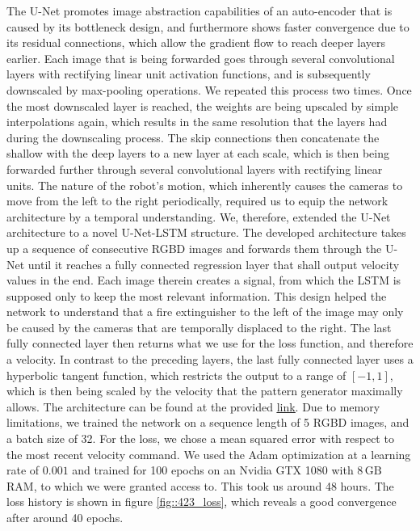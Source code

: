 The U-Net promotes image abstraction capabilities of an auto-encoder that is caused by its bottleneck design, and furthermore shows faster convergence due to its residual connections, which allow the gradient flow to reach deeper layers earlier. Each image that is being forwarded goes through several convolutional layers with rectifying linear unit activation functions, and is subsequently downscaled by max-pooling operations. We repeated this process two times. Once the most downscaled layer is reached, the weights are being upscaled by simple interpolations again, which results in the same resolution that the layers had during the downscaling process. The skip connections then concatenate the shallow with the deep layers to a new layer at each scale, which is then being forwarded further through several convolutional layers with rectifying linear units. The nature of the robot's motion, which inherently causes the cameras to move from the left to the right periodically, required us to equip the network architecture by a temporal understanding. We, therefore, extended the U-Net architecture to a novel U-Net-LSTM structure. The developed architecture takes up a sequence of consecutive RGBD images and forwards them through the U-Net until it reaches a fully connected regression layer that shall output velocity values in the end. Each image therein creates a signal, from which the LSTM is supposed only to keep the most relevant information. This design helped the network to understand that a fire extinguisher to the left of the image may only be caused by the cameras that are temporally displaced to the right. The last fully connected layer then returns what we use for the loss function, and therefore a velocity. In contrast to the preceding layers, the last fully connected layer uses a hyperbolic tangent function, which restricts the output to a range of $[-1,1]$, which is then being scaled by the velocity that the pattern generator maximally allows. The architecture can be found at the provided \href{https://github.com/mhubii/nmpc_pattern_generator/blob/master/libs/learning/python/unet_model.py}{\underline{link}}. Due to memory limitations, we trained the network on a sequence length of 5 RGBD images, and a batch size of 32. For the loss, we chose a mean squared error with respect to the most recent velocity command. We used the Adam optimization \cite{kingma2014adam} at a learning rate of  $0.001$ and trained for 100 epochs on an Nvidia GTX 1080 with $8\,\text{GB}$ RAM, to which we were granted access to. This took us around 48 hours. The loss history is shown in figure \ref{fig::423_loss}, which reveals a good convergence after around 40 epochs.

